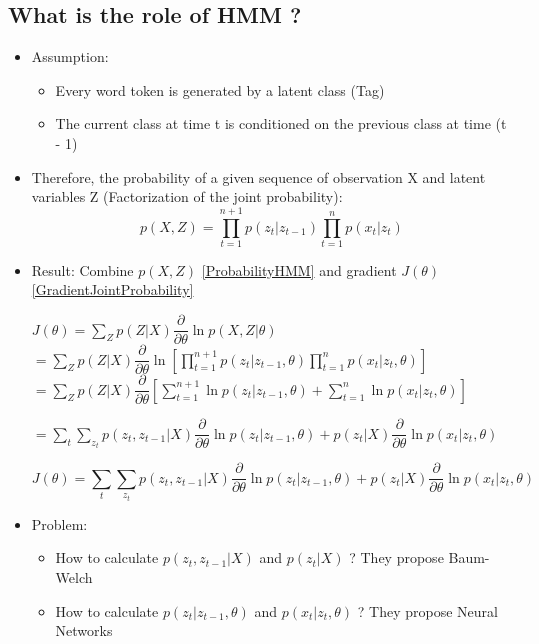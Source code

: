 \documentclass{article}
\begin{document}
\subsection{What is the role of HMM ?}
\begin{itemize}
\item Assumption:
	\begin{itemize}
	\item Every word token is generated by a latent class (Tag)
	\item The current class at time t is conditioned on the previous class at time (t - 1)
	\end{itemize}

\item Therefore, the probability of a given sequence of observation X and latent variables Z (Factorization of the joint probability):
	\begin{equation}
	p(X,Z) = \prod_{t=1}^{n + 1} p(z_{t}|z_{t-1})\prod_{t=1}^{n} p(x_{t}|z_{t})
	\label{ProbabilityHMM}
	\end{equation}
	
\item Result: Combine $p(X,Z)$ \eqref{ProbabilityHMM} and gradient $J(\theta)$ \eqref{GradientJointProbability}

$J(\theta) = \sum_{Z} p(Z|X) \dfrac{\partial}{\partial\theta} \ln p(X,Z| \theta)$ \\

$ = \sum_{Z} p(Z|X) \dfrac{\partial}{\partial\theta} \ln [\prod_{t=1}^{n + 1} p(z_{t}|z_{t-1},\theta)\prod_{t=1}^{n} p(x_{t}|z_{t},\theta) ]$ \\

$ = \sum_{Z} p(Z|X) \dfrac{\partial}{\partial\theta}  [\sum_{t=1}^{n + 1} \ln p(z_{t}|z_{t-1},\theta) + \sum_{t=1}^{n} \ln p(x_{t}|z_{t},\theta) ]$

$ = \sum_{t}\sum_{z_{t}} p(z_{t}, z_{t-1}|X) \dfrac{\partial}{\partial\theta} \ln p(z_{t}|z_{t-1},\theta) + p(z_{t}|X) \dfrac{\partial}{\partial\theta} \ln p(x_{t}|z_{t},\theta) $

\begin{equation}
	J(\theta) = \sum_{t}\sum_{z_{t}} p(z_{t}, z_{t-1}|X) \dfrac{\partial}{\partial\theta} \ln p(z_{t}|z_{t-1},\theta) + p(z_{t}|X) \dfrac{\partial}{\partial\theta} \ln p(x_{t}|z_{t},\theta)
\end{equation}

\item Problem:
	\begin{itemize}
	\item How to calculate $p(z_{t}, z_{t-1}|X)$ and $p(z_{t}|X)$ ? They propose Baum-Welch
	\item How to calculate $p(z_{t}|z_{t-1},\theta)$ and $p(x_{t}|z_{t},\theta)$ ? They propose Neural Networks
	\end{itemize}
\end{itemize}
\end{document}
